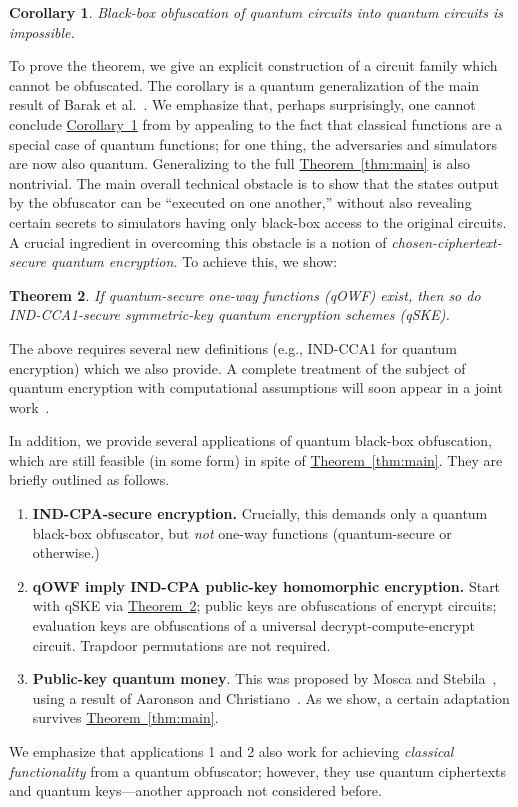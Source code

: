 \documentclass[11pt]{amsart}
\numberwithin{equation}{section}
\newtheorem{theorem}{Theorem}
\newtheorem{corollary}[theorem]{Corollary}
\newcommand{\expref}[2]{\texorpdfstring{\hyperref[#2]{#1~\ref{#2}}}{#1~\ref{#2}}}
\begin{document}
\begin{corollary}\label{cor:main}
Black-box obfuscation of quantum circuits into quantum circuits is impossible.
\end{corollary}

\noindent To prove the theorem, we give an explicit construction of a circuit family which cannot be obfuscated. The corollary is a quantum generalization of the main result of Barak et al.~\cite{BGIRSVY01}. We emphasize that, perhaps surprisingly, one cannot conclude \expref{Corollary}{cor:main} from \cite{BGIRSVY01} by appealing to the fact that classical functions are a special case of quantum functions; for one thing, the adversaries and simulators are now also quantum. Generalizing to the full \expref{Theorem}{thm:main} is also nontrivial. The main overall technical obstacle is to show that the states output by the obfuscator can be ``executed on one another,'' without also revealing certain secrets to simulators having only black-box access to the original circuits. A crucial ingredient in overcoming this obstacle is a notion of \emph{chosen-ciphertext-secure quantum encryption.} To achieve this, we show:

\begin{theorem}\label{thm:cca}
If quantum-secure one-way functions (qOWF) exist, then so do IND-CCA1-secure symmetric-key quantum encryption schemes (qSKE).
\end{theorem}

\noindent The above requires several new definitions (e.g., IND-CCA1 for quantum encryption) which we also provide. A complete treatment of the subject of quantum encryption with computational assumptions will soon appear in a joint work~\cite{ABFGSS15}.

In addition, we provide several applications of quantum black-box obfuscation, which are still feasible (in some form) in spite of \expref{Theorem}{thm:main}. They are briefly outlined as follows.
\begin{enumerate}
\item \textbf{IND-CPA-secure encryption.} Crucially, this demands only a quantum black-box obfuscator, but \emph{not} one-way functions (quantum-secure or otherwise.)
\item \textbf{qOWF imply IND-CPA public-key homomorphic encryption.} Start with qSKE via \expref{Theorem}{thm:cca}; public keys are obfuscations of encrypt circuits; evaluation keys are obfuscations of a universal decrypt-compute-encrypt circuit. Trapdoor permutations are not required.
\item \textbf{Public-key quantum money}. This was proposed by Mosca and Stebila~\cite{MS10}, using a result of Aaronson and Christiano~\cite{Aar09, AC12}. As we show, a certain adaptation survives \expref{Theorem}{thm:main}.
\end{enumerate}
\noindent We emphasize that applications 1 and 2 also work for achieving \emph{classical functionality} from a quantum obfuscator; however, they use quantum ciphertexts and quantum keys---another approach not considered before.
\end{document}

